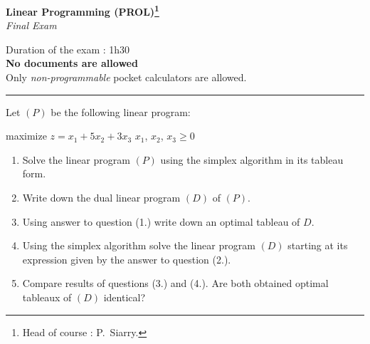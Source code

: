 \documentclass[12pt,a4paper]{article}
\begin{document}
\begin{center}

  {\Large \textbf{Linear Programming (PROL)\footnote{Head of course : P.~Siarry.}}}\\

  \vspace{10pt}
  {\Large \textit{Final Exam}}

  \vspace{2\baselineskip}
\end{center}
\begin{center}
\begin{minipage}{\textwidth}
  Duration of the exam : 1h30\\
  \textbf{No documents are allowed}\\
  Only \emph{non-programmable} pocket calculators are allowed.
\end{minipage}
\end{center}
\rule{\textwidth}{2pt}
\vspace{2\baselineskip}

\noindent Let $(P)$ be the following linear program:
\begin{center}
\begin{linearProg}{
maximize
}{
$z = x_1 + 5x_2 + 3x_3$
}{
}{
$x_1$, $x_2$, $x_3 \geq 0$
}
\end{linearProg}
\end{center}

\begin{enumerate}
\item Solve the linear program $(P)$ using the simplex algorithm in
  its tableau form.
\item Write down the dual linear program $(D)$ of $(P)$.
\item Using answer to question (1.) write down an optimal tableau of
  $D$.
\item Using the simplex algorithm solve the linear program $(D)$
  starting at its expression given by the answer to question (2.).
\item Compare results of questions (3.) and (4.). Are both obtained
  optimal tableaux of $(D)$ identical?
\end{enumerate}
\end{document}
